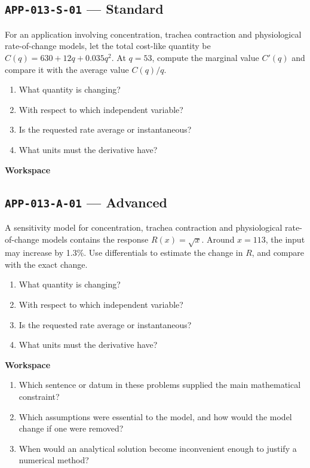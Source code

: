 \documentclass[11pt]{book}
\newcommand{\pid}[1]{\texttt{#1}}
\newcommand{\workspace}{\par\vspace{0.7in}\hrulefill\par\vspace{0.55in}\hrulefill\par}
\begin{document}
\subsection*{\pid{APP-013-S-01} — Standard}
\begin{problembox}
For an application involving concentration, trachea contraction and physiological rate-of-change models, let the total cost-like quantity be $C(q)=630+12q+0.035q^2$. At $q=53$, compute the marginal value $C'(q)$ and compare it with the average value $C(q)/q$.
\end{problembox}
\begin{promptbox}\begin{enumerate}
\item What quantity is changing?
\item With respect to which independent variable?
\item Is the requested rate average or instantaneous?
\item What units must the derivative have?
\end{enumerate}\end{promptbox}
\textbf{Workspace}\workspace
{}
\subsection*{\pid{APP-013-A-01} — Advanced}
\begin{problembox}
A sensitivity model for concentration, trachea contraction and physiological rate-of-change models contains the response $R(x)=\sqrt{x}$. Around $x=113$, the input may increase by 1.3\%. Use differentials to estimate the change in $R$, and compare with the exact change.
\end{problembox}
\begin{promptbox}\begin{enumerate}
\item What quantity is changing?
\item With respect to which independent variable?
\item Is the requested rate average or instantaneous?
\item What units must the derivative have?
\end{enumerate}\end{promptbox}
\textbf{Workspace}\workspace
\begin{reflectionbox}\begin{enumerate}
\item Which sentence or datum in these problems supplied the main mathematical constraint?
\item Which assumptions were essential to the model, and how would the model change if one were removed?
\item When would an analytical solution become inconvenient enough to justify a numerical method?
\end{enumerate}\end{reflectionbox}
\end{document}
